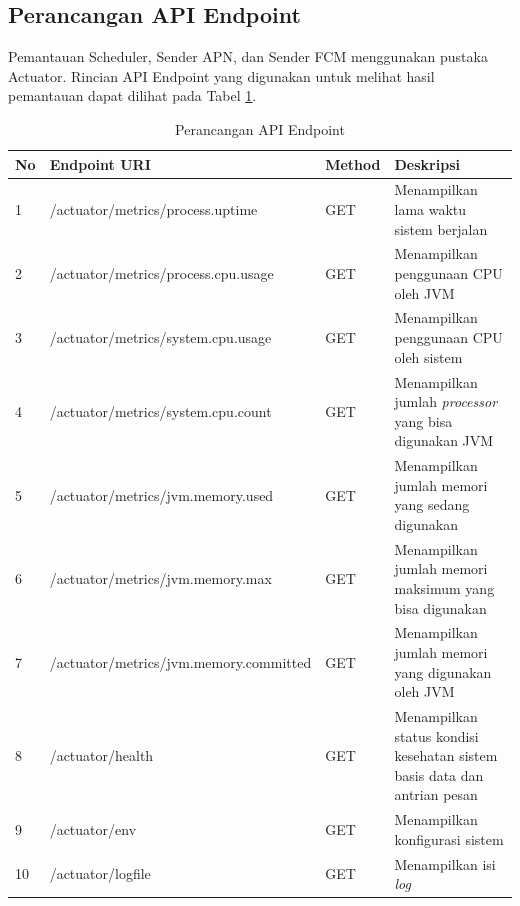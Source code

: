 \subsection{Perancangan API Endpoint}
\par Pemantauan Scheduler, Sender APN, dan Sender FCM menggunakan pustaka Actuator. Rincian API Endpoint yang digunakan untuk melihat hasil pemantauan dapat dilihat pada Tabel \ref{t:rancangan_api}.
\begin{longtable}[H]{|p{0.5cm}|p{3.5cm}|p{1.2cm}|p{3.5cm}|}
	\caption{Perancangan API Endpoint} \label{t:rancangan_api} \\ \hline
	\rowcolor{lightgray} No & Endpoint URI & Method & Deskripsi \\ \hline
	\endhead
	1 & /actuator/metrics/\newline process.uptime & GET & Menampilkan lama waktu sistem berjalan \\ \hline
	2 & /actuator/metrics/\newline process.cpu.usage & GET & Menampilkan penggunaan CPU oleh JVM \\ \hline
	3 & /actuator/metrics/\newline system.cpu.usage & GET & Menampilkan penggunaan CPU oleh sistem \\ \hline
	4 & /actuator/metrics/\newline system.cpu.count & GET & Menampilkan jumlah \textit{processor} yang bisa digunakan JVM \\ \hline
	5 & /actuator/metrics/\newline jvm.memory.used & GET & Menampilkan jumlah memori yang sedang digunakan \\ \hline
	6 & /actuator/metrics/\newline jvm.memory.max & GET & Menampilkan jumlah memori maksimum yang bisa digunakan \\ \hline
	7 & /actuator/metrics/\newline jvm.memory.committed & GET & Menampilkan jumlah memori yang digunakan oleh JVM \\ \hline
	8 & /actuator/health & GET & Menampilkan status kondisi kesehatan sistem basis data dan antrian pesan \\ \hline
	9 & /actuator/env & GET & Menampilkan konfigurasi sistem \\ \hline
	10 & /actuator/logfile & GET & Menampilkan isi \textit{log} \\ \hline
\end{longtable}
